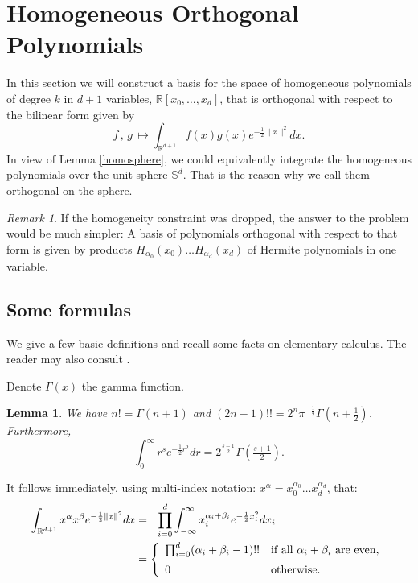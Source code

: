 \documentclass{amsart}
\newcommand{\R}{\mathbb{R}}
\renewcommand{\S}{\mathbb{S}}
\theoremstyle{plain}
\newtheorem{lemma}[theorem]{Lemma}
\theoremstyle{definition}
\theoremstyle{remark}
\newtheorem{remark}[theorem]{Remark}
\begin{document}
\section{Homogeneous Orthogonal Polynomials}
In this section we will construct a basis for the space of homogeneous polynomials of degree $k$ in $d+1$ variables, $\R[x_0,\ldots,x_d]$, that is orthogonal with respect to the bilinear form given by
\begin{equation*}
 f\,,\,g\, \longmapsto \int_{\R^{d+1}}f(x)g(x)e^{-\frac{1}{2}\|x\|^2} dx.
\end{equation*}
In view of Lemma \ref{homosphere}, we could equivalently integrate the homogeneous polynomials over the unit sphere $\S^d$. That is the reason why we call them orthogonal on the sphere.
\begin{remark}
 If the homogeneity constraint was dropped, the answer to the problem would be much simpler: A basis of polynomials orthogonal with respect to that form is given by products $H_{\alpha_0}\!(x_0)\ldots H_{\alpha_d}\!(x_d)$ of Hermite polynomials in one variable.
\end{remark}
\subsection{Some formulas}
We give a few basic definitions and recall some facts on elementary calculus. The reader may also consult \cite{Folland}.

Denote $\Gamma(x)$ the gamma function.
\begin{lemma}
We have $n!=\Gamma(n+1)$ and $(2n-1)!! = 2^{n}\pi^{-\frac{1}{2}}\Gamma\left(n+\frac{1}{2}\right)$. Furthermore,
\begin{equation}
 \int_0^\infty r^se^{-\frac{1}{2}r^2} dr = 2^{\frac{s-1}{2}}\Gamma\left(\tfrac{s+1}{2}\right).
\end{equation}
\end{lemma}
It follows immediately, using multi-index notation: $x^\alpha = x_0^{\alpha_0}\ldots x_d^{\alpha_d}$, that:
\begin{align}    
 \int_{\R^{d+1}}x^\alpha x^\beta e^{-\frac{1}{2}\|x\|^2} dx &= \ \ 
\displaystyle \prod_{i=0}^d \int_{-\infty}^\infty x_i^{\alpha_i+\beta_i} e^{-\frac{1}{2}x_i^2} dx_i \\
 &= \left\{
\begin{array}{*2{l}p{5cm}}
 \prod_{i=0}^d (\alpha_i+\beta_i-1)!! &\text{if all }\alpha_i+\beta_i\text{ are even}, \vspace{0.2cm} \\ 
 0 &\text{otherwise}.
\end{array}
  \right.\nonumber
\end{align}
\end{document}
